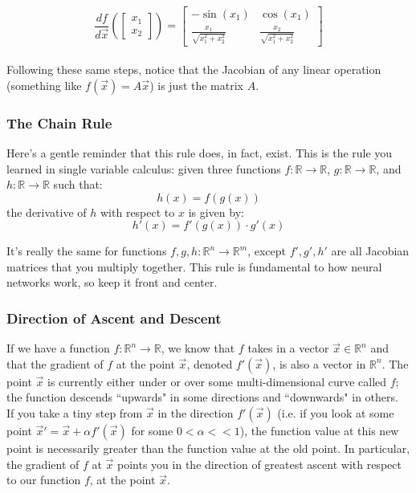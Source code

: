 \documentclass{article}
\begin{document}
\[\frac{df}{d\vec{x}} \left(\begin{bmatrix}x_1 \\ x_2\end{bmatrix}\right) = \begin{bmatrix} -\sin(x_1) & \cos(x_1) \\ \frac{x_1}{\sqrt{x_1^2 + x_2^2}} & \frac{x_2}{\sqrt{x_1^2 + x_2^2}}\end{bmatrix}\]
\\
Following these same steps, notice that the Jacobian of any linear operation (something like $f\left(\vec{x}\right) = A\vec{x}$) is just the matrix $A$.


\subsubsection{The Chain Rule}
Here's a gentle reminder that this rule does, in fact, exist. This is the rule you learned in single variable calculus: given three functions $f: \mathbb{R} \to \mathbb{R}$,  $g: \mathbb{R} \to \mathbb{R}$, and $h: \mathbb{R} \to \mathbb{R}$ such that:
\[h(x) = f(g(x))\]
the derivative of $h$ with respect to $x$ is given by:
\[h'(x) = f'(g(x)) \cdot g'(x)\]

It's really the same for functions $f, g, h: \mathbb{R}^n \to \mathbb{R}^m$, except $f', g', h'$ are all Jacobian matrices that you multiply together. This rule is fundamental to how neural networks work, so keep it front and center.

\subsubsection{Direction of Ascent and Descent}

If we have a function $f: \mathbb{R}^n \to \mathbb{R}$, we know that $f$ takes in a vector $\vec{x}\in\mathbb{R}^n$ and that the gradient of $f$ at the point $\vec{x}$, denoted $f'(\vec{x})$, is also a vector in $\mathbb{R}^n$. The point $\vec{x}$ is currently either under or over some multi-dimensional curve called $f$; the function descends ``upwards" in some directions and ``downwards" in others. \\

If you take a tiny step from $\vec{x}$ in the direction $f'(\vec{x})$ (i.e. if you look at some point $\vec{x}' = \vec{x} + \alpha f'(\vec{x})$ for some $0 < \alpha << 1$), the function value at this new point is necessarily greater than the function value at the old point. In particular, the gradient of $f$ at $\vec{x}$ points you in the direction of greatest ascent with respect to our function $f$, at the point $\vec{x}$. \\
\end{document}
